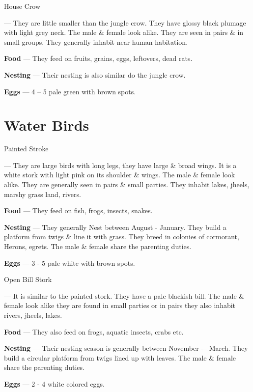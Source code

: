 \begin{bird}{House Crow}

 --- They are little smaller than the jungle crow. They have glossy black plumage with light grey neck. The male \& female look alike. They are seen in pairs \& in small groups. They generally inhabit near human habitation.

{\large\bf Food} --- They feed on fruits, grains, eggs, leftovers, dead rats.

{\large\bf Nesting} --- Their nesting is also similar do the jungle crow.

{\large\bf Eggs} --- 4 -- 5 pale green with brown spots.
\end{bird}

\part{Water Birds}

\begin{bird}{Painted Stroke}

 --- They are large birds with long legs, they have large \& broad wings. It is a white stork with light pink on its shoulder \& wings. The male \& female look alike. They are generally seen in pairs \& small parties. They inhabit lakes, jheels, marshy grass land, rivers.

{\large\bf Food} --- They feed on fish, frogs, insects, snakes.

{\large\bf Nesting} --- They generally Nest between August - January. They build a platform from twigs \& line it with grass. They breed in colonies of cormorant, Herons, egrets. The male \& female share the parenting duties.

{\large\bf Eggs} --- 3 - 5 pale white with brown spots.
\end{bird}

\begin{bird}{Open Bill Stork}

 --- It is similar to the painted stork. They have a pale blackish bill. The male \& female look alike they are found in small parties or in pairs they also inhabit rivers, jheels, lakes.

{\large\bf Food} --- They also feed on frogs, aquatic insects, crabs etc.

{\large\bf Nesting} --- Their nesting season is generally between November -– March. They build a circular platform from twigs lined up with leaves. The male \& female share the parenting duties. 

{\large\bf Eggs} --- 2 - 4 white colored eggs.
\end{bird}

